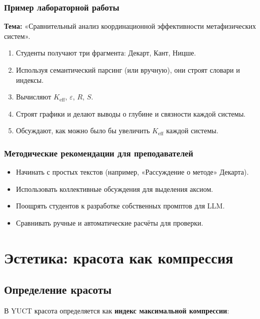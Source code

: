 \documentclass[12pt,a4paper]{article}
\newcommand{\eps}{\varepsilon}
\begin{document}
	\subsubsection{Пример лабораторной работы}
	
	\textbf{Тема:} «Сравнительный анализ координационной эффективности метафизических систем».
	
	\begin{enumerate}
		\item Студенты получают три фрагмента: Декарт, Кант, Ницше.
		\item Используя семантический парсинг (или вручную), они строят словари и индексы.
		\item Вычисляют \(K_{\mathrm{eff}}\), \(\eps\), \(R\), \(S\).
		\item Строят графики и делают выводы о глубине и связности каждой системы.
		\item Обсуждают, как можно было бы увеличить \(K_{\mathrm{eff}}\) каждой системы.
	\end{enumerate}
	
	\subsubsection{Методические рекомендации для преподавателей}
	
	\begin{itemize}
		\item Начинать с простых текстов (например, «Рассуждение о методе» Декарта).
		\item Использовать коллективные обсуждения для выделения аксиом.
		\item Поощрять студентов к разработке собственных промптов для LLM.
		\item Сравнивать ручные и автоматические расчёты для проверки.
	\end{itemize}
	
	\section{Эстетика: красота как компрессия}
	
	\subsection{Определение красоты}
	
	В YUCT красота определяется как \textbf{индекс максимальной компрессии}:
	
\end{document}
